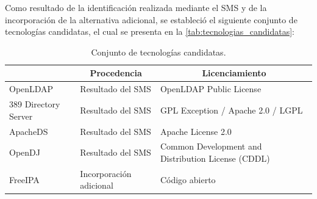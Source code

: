 Como resultado de la identificación realizada mediante el \ac{SMS} y de la incorporación de la alternativa adicional, se estableció el siguiente conjunto de tecnologías candidatas, el cual se presenta en la \autoref{tab:tecnologias_candidatas}:

\begin{table}[htbp]
	\centering
	\caption{Conjunto de tecnologías candidatas.}
	\fontsize{9pt}{10pt}\selectfont
	\renewcommand{\arraystretch}{1.4} %
	\begin{tabularx}{\textwidth}{|l|l|X|}
		\hline
		\rowcolor[gray]{0.85} %
		\multicolumn{1}{|c|}{\textbf{Tecnología}} &
		\multicolumn{1}{c|}{\textbf{Procedencia}} &
		\multicolumn{1}{c|}{\textbf{Licenciamiento}}
		\\
		\hline
		OpenLDAP                                  &
		Resultado del \acs{SMS}                   &
		OpenLDAP Public License
		\\
		\hline
		389 Directory Server                      &
		Resultado del \acs{SMS}                   &
		\ac{GPL} Exception / Apache 2.0 / \ac{LGPL}
		\\
		\hline
		ApacheDS                                  &
		Resultado del \acs{SMS}                   &
		Apache License 2.0
		\\
		\hline
		OpenDJ                                    &
		Resultado del \acs{SMS}                   &
		Common Development and Distribution License (\ac{CDDL})
		\\
		\hline
		FreeIPA                                   &
		Incorporación adicional                   &
		Código abierto
		\\
		\hline
	\end{tabularx}
	\label{tab:tecnologias_candidatas}
\end{table}
